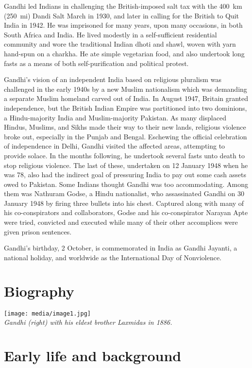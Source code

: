 Gandhi led Indians in challenging the British-imposed salt tax with the
400~km (250~mi) Dandi Salt March in 1930, and later in calling for the
British to Quit India in 1942. He was imprisoned for many years, upon
many occasions, in both South Africa and India. He lived modestly in a
self-sufficient residential community and wore the traditional Indian
dhoti and shawl, woven with yarn hand-spun on a charkha. He ate simple
vegetarian food, and also undertook long fasts as a means of both
self-purification and political protest.

Gandhi's vision of an independent India based on religious pluralism was
challenged in the early 1940s by a new Muslim nationalism which was
demanding a separate Muslim homeland carved out of India. In August
1947, Britain granted independence, but the British Indian Empire was
partitioned into two dominions, a Hindu-majority India and
Muslim-majority Pakistan. As many displaced Hindus, Muslims, and Sikhs
made their way to their new lands, religious violence broke out,
especially in the Punjab and Bengal. Eschewing the official celebration
of independence in Delhi, Gandhi visited the affected areas, attempting
to provide solace. In the months following, he undertook several fasts
unto death to stop religious violence. The last of these, undertaken on
12 January 1948 when he was 78, also had the indirect goal of pressuring
India to pay out some cash assets owed to Pakistan. Some Indians thought
Gandhi was too accommodating. Among them was Nathuram Godse, a Hindu
nationalist, who assassinated Gandhi on 30 January 1948 by firing three
bullets into his chest. Captured along with many of his co-conspirators
and collaborators, Godse and his co-conspirator Narayan Apte were tried,
convicted and executed while many of their other accomplices were given
prison sentences.

Gandhi's birthday, 2 October, is commemorated in India as Gandhi
Jayanti, a national holiday, and worldwide as the International Day of
Nonviolence.

\section{Biography}\label{biography}

\texttt{[image: media/image1.jpg]}\\
\emph{Gandhi (right) with his eldest brother Laxmidas in 1886.}

\section{Early life and background}\label{early-life-and-background}

